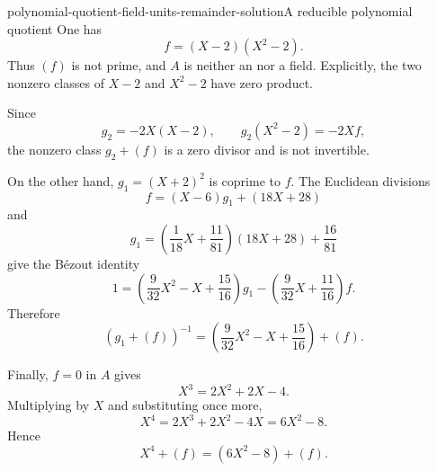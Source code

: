 \documentclass[preview]{standalone}
\begin{document}
\begin{snippetsolution}{polynomial-quotient-field-units-remainder-solution}{A reducible polynomial quotient}
    One has
    \[
        f=(X-2)(X^2-2).
    \]
    Thus \((f)\) is not prime, and \(A\) is neither an
    \integraldomain nor a field. Explicitly, the two nonzero classes
    of \(X-2\) and \(X^2-2\) have zero product.

    Since
    \[
        g_2=-2X(X-2),
        \qquad
        g_2(X^2-2)=-2Xf,
    \]
    the nonzero class \(g_2+(f)\) is a zero divisor and is not
    invertible.

    On the other hand, \(g_1=(X+2)^2\) is coprime to \(f\). The
    Euclidean divisions
    \[
        f=(X-6)g_1+(18X+28)
    \]
    and
    \[
        g_1=
        \left(\frac1{18}X+\frac{11}{81}\right)(18X+28)
        +\frac{16}{81}
    \]
    give the Bézout identity
    \[
        1=
        \left(\frac9{32}X^2-X+\frac{15}{16}\right)g_1
        -
        \left(\frac9{32}X+\frac{11}{16}\right)f.
    \]
    Therefore
    \[
        (g_1+(f))^{-1}
        =
        \left(\frac9{32}X^2-X+\frac{15}{16}\right)+(f).
    \]

    Finally, \(f=0\) in \(A\) gives
    \[
        X^3=2X^2+2X-4.
    \]
    Multiplying by \(X\) and substituting once more,
    \[
        X^4
        =2X^3+2X^2-4X
        =6X^2-8.
    \]
    Hence
    \[
        X^4+(f)=(6X^2-8)+(f).
    \]
\end{snippetsolution}
\end{document}

